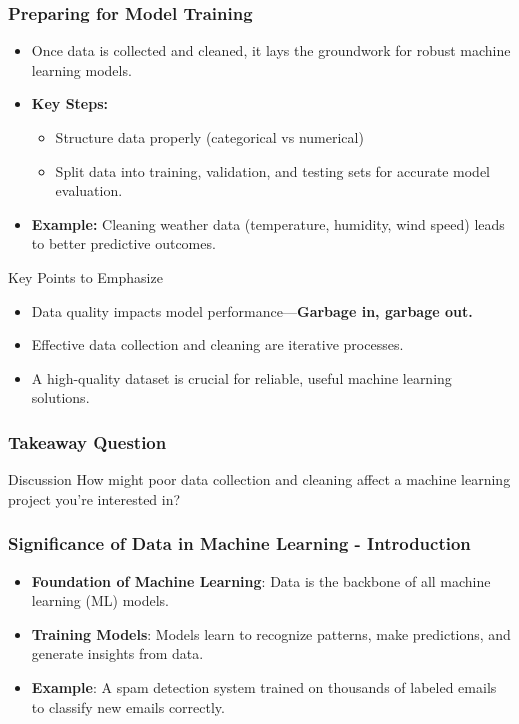 \documentclass[aspectratio=169]{beamer}
\begin{document}
\begin{frame}[fragile]
    \frametitle{Preparing for Model Training}
    \begin{itemize}
        \item Once data is collected and cleaned, it lays the groundwork for robust machine learning models.
        \item \textbf{Key Steps:}
        \begin{itemize}
            \item Structure data properly (categorical vs numerical)
            \item Split data into training, validation, and testing sets for accurate model evaluation.
        \end{itemize}
        \item \textbf{Example:} Cleaning weather data (temperature, humidity, wind speed) leads to better predictive outcomes.
    \end{itemize}

    \begin{block}{Key Points to Emphasize}
        \begin{itemize}
            \item Data quality impacts model performance—\textbf{Garbage in, garbage out.}
            \item Effective data collection and cleaning are iterative processes.
            \item A high-quality dataset is crucial for reliable, useful machine learning solutions.
        \end{itemize}
    \end{block}
\end{frame}

\begin{frame}[fragile]
    \frametitle{Takeaway Question}
    \begin{block}{Discussion}
        How might poor data collection and cleaning affect a machine learning project you're interested in? 
    \end{block}
\end{frame}

\begin{frame}[fragile]
    \frametitle{Significance of Data in Machine Learning - Introduction}
    \begin{itemize}
        \item \textbf{Foundation of Machine Learning}: Data is the backbone of all machine learning (ML) models.
        \item \textbf{Training Models}: Models learn to recognize patterns, make predictions, and generate insights from data.
        \item \textbf{Example}: A spam detection system trained on thousands of labeled emails to classify new emails correctly.
    \end{itemize}
\end{frame}
\end{document}
